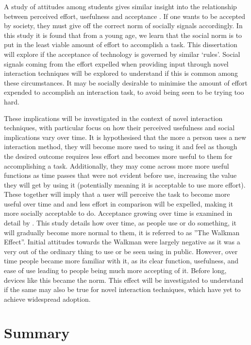 \documentclass{l4proj}
\begin{document}
 A study of attitudes among students gives similar insight into the relationship between perceived effort, usefulness and acceptance \citep{warrington_student_2000}. If one wants to be accepted by society, they must give off the correct norm of socially signals accordingly. In this study it is found that from a young age, we learn that the social norm is to put in the least viable amount of effort to accomplish a task. This dissertation will explore if the acceptance of technology is governed by similar `rules'. Social signals coming from the effort expelled when providing input through novel interaction techniques will be explored to understand if this is common among these circumstances. It may be socially desirable to minimise the amount of effort expended to accomplish an interaction task, to avoid being seen to be trying too hard.

These implications will be investigated in the context of novel interaction techniques, with particular focus on how their perceived usefulness and social implications vary over time. It is hypothesised that the more a person uses a new interaction method, they will become more used to using it and feel as though the desired outcome requires less effort and becomes more useful to them for accomplishing a task. Additionally, they may come across more more useful functions as time passes that were not evident before use, increasing the value they will get by using it (potentially meaning it is acceptable to use more effort). These together will imply that a user will perceive the task to become more useful over time and and less effort in comparison will be expelled, making it more socially acceptable to do. Acceptance growing over time is examined in detail by  \citet{hosokawa_walkman_1984}. This study details how over time, as people use or do something, it will gradually become more normal to them, it is referred to as ''The Walkman Effect''. Initial attitudes towards the Walkman were largely negative as it was a very out of the ordinary thing to use or be seen using in public. However, over time people became more familiar with it, as its clear function, usefulness, and ease of use leading to people being much more accepting of it. Before long, devices like this became the norm. This effect will be investigated to understand if the same may also be true for novel interaction techniques, which have yet to achieve widespread adoption.

\section{Summary}
\end{document}
